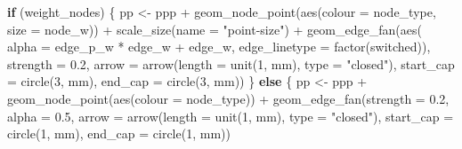 \documentclass[
  letterpaper,
  DIV=11,
  numbers=noendperiod]{scrartcl}
\newenvironment{Shaded}{\begin{snugshade}}{\end{snugshade}}
\newcommand{\AttributeTok}[1]{\textcolor[rgb]{0.40,0.45,0.13}{#1}}
\newcommand{\ControlFlowTok}[1]{\textcolor[rgb]{0.00,0.23,0.31}{\textbf{#1}}}
\newcommand{\DecValTok}[1]{\textcolor[rgb]{0.68,0.00,0.00}{#1}}
\newcommand{\FloatTok}[1]{\textcolor[rgb]{0.68,0.00,0.00}{#1}}
\newcommand{\FunctionTok}[1]{\textcolor[rgb]{0.28,0.35,0.67}{#1}}
\newcommand{\NormalTok}[1]{\textcolor[rgb]{0.00,0.23,0.31}{#1}}
\newcommand{\OtherTok}[1]{\textcolor[rgb]{0.00,0.23,0.31}{#1}}
\newcommand{\SpecialCharTok}[1]{\textcolor[rgb]{0.37,0.37,0.37}{#1}}
\newcommand{\StringTok}[1]{\textcolor[rgb]{0.13,0.47,0.30}{#1}}
\begin{document}
\begin{Shaded}
\begin{Highlighting}[]
    \ControlFlowTok{if}\NormalTok{ (weight\_nodes) \{}
\NormalTok{        pp }\OtherTok{\textless{}{-}}\NormalTok{ ppp }\SpecialCharTok{+}
            \FunctionTok{geom\_node\_point}\NormalTok{(}\FunctionTok{aes}\NormalTok{(}\AttributeTok{colour =}\NormalTok{ node\_type,}
                                \AttributeTok{size =}\NormalTok{ node\_w)) }\SpecialCharTok{+}
            \FunctionTok{scale\_size}\NormalTok{(}\AttributeTok{name =} \StringTok{"point{-}size"}\NormalTok{) }\SpecialCharTok{+}
            \FunctionTok{geom\_edge\_fan}\NormalTok{(}\FunctionTok{aes}\NormalTok{(}
                \AttributeTok{alpha =}\NormalTok{ edge\_p\_w }\SpecialCharTok{*}\NormalTok{ edge\_w }\SpecialCharTok{+}\NormalTok{ edge\_w, }
                \AttributeTok{edge\_linetype =} \FunctionTok{factor}\NormalTok{(switched)), }
                \AttributeTok{strength =} \FloatTok{0.2}\NormalTok{,}
                \AttributeTok{arrow =} \FunctionTok{arrow}\NormalTok{(}\AttributeTok{length =} \FunctionTok{unit}\NormalTok{(}\DecValTok{1}\NormalTok{, }\StringTok{\textquotesingle{}mm\textquotesingle{}}\NormalTok{),}
                              \AttributeTok{type =} \StringTok{"closed"}\NormalTok{),}
                \AttributeTok{start\_cap =} \FunctionTok{circle}\NormalTok{(}\DecValTok{3}\NormalTok{, }\StringTok{\textquotesingle{}mm\textquotesingle{}}\NormalTok{),}
                \AttributeTok{end\_cap =} \FunctionTok{circle}\NormalTok{(}\DecValTok{3}\NormalTok{, }\StringTok{\textquotesingle{}mm\textquotesingle{}}\NormalTok{))}
\NormalTok{    \} }\ControlFlowTok{else}\NormalTok{ \{}
\NormalTok{        pp }\OtherTok{\textless{}{-}}\NormalTok{ ppp }\SpecialCharTok{+}
            \FunctionTok{geom\_node\_point}\NormalTok{(}\FunctionTok{aes}\NormalTok{(}\AttributeTok{colour =}\NormalTok{ node\_type)) }\SpecialCharTok{+}
            \FunctionTok{geom\_edge\_fan}\NormalTok{(}\AttributeTok{strength =} \FloatTok{0.2}\NormalTok{, }\AttributeTok{alpha =} \FloatTok{0.5}\NormalTok{,}
                          \AttributeTok{arrow =} \FunctionTok{arrow}\NormalTok{(}\AttributeTok{length =} \FunctionTok{unit}\NormalTok{(}\DecValTok{1}\NormalTok{, }\StringTok{\textquotesingle{}mm\textquotesingle{}}\NormalTok{),}
                                        \AttributeTok{type =} \StringTok{"closed"}\NormalTok{),}
                          \AttributeTok{start\_cap =} \FunctionTok{circle}\NormalTok{(}\DecValTok{1}\NormalTok{, }\StringTok{\textquotesingle{}mm\textquotesingle{}}\NormalTok{),}
                          \AttributeTok{end\_cap =} \FunctionTok{circle}\NormalTok{(}\DecValTok{1}\NormalTok{, }\StringTok{\textquotesingle{}mm\textquotesingle{}}\NormalTok{))}
            

\end{Highlighting}
\end{Shaded}
\end{document}
